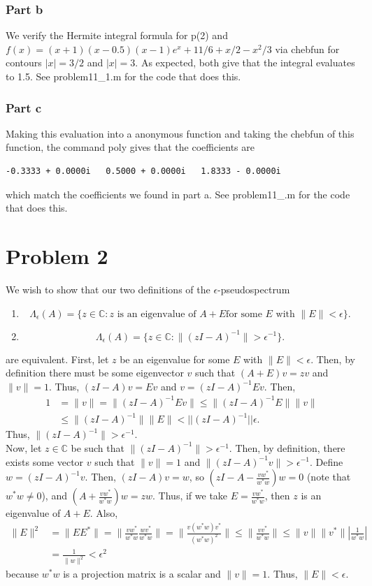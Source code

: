 \documentclass{article}
\begin{document}
\subsubsection{Part b}
We verify the Hermite integral formula for p(2) and $f(x)=(x+1)(x-0.5)(x-1)e^x+ 11/6+x/2-x^2/3$ via chebfun for contours $|x|=3/2$ and $|x|=3$. As expected, both give that the integral evaluates to 1.5. See problem11\_1.m for the code that does this.

\subsubsection{Part c}
Making this evaluation into a anonymous function and taking the chebfun of this function, the command poly gives that the coefficients are 
\begin{verbatim}
-0.3333 + 0.0000i   0.5000 + 0.0000i   1.8333 - 0.0000i
\end{verbatim}
which match the coefficients we found in part a. See problem11\_.m for the code that does this. 

\section{Problem 2} 
We wish to show that our two definitions of the $\epsilon$-pseudospectrum
\begin{enumerate}
\item 
\[
\Lambda_{\epsilon} (A) = \{ z \in \mathbb{C} : z \mbox{ is an eigenvalue of $A+E$
for some $E$ with $\| E \| < \epsilon$} \} .
\]
\item
\[
\Lambda_{\epsilon} (A) = \{ z \in \mathbb{C} : \| (zI - A )^{-1} \| > \epsilon^{-1} \} .
\]
\end{enumerate}
are equivalent. First, let $z$ be an eigenvalue for some $E$ with $\| E \| < \epsilon$. Then, by definition there must be some eigenvector $v$ such that $(A+E)v=zv$ and $\|v\|=1$. Thus, $(zI-A)v=Ev$ and $v=(zI-A)^{-1}Ev$. Then,
\begin{align*}
1&=\|v\|=\|(zI-A)^{-1}Ev\|\leq\|(zI-A)^{-1}E\|\|v\|\\&\leq\|(zI-A)^{-1}\|\|E\|<||(zI-A)^{-1}||\epsilon.
\end{align*}
Thus, $\|(zI - A )^{-1} \| > \epsilon^{-1}$. \\
Now, let $z\in\mathbb{C}$ be such that $\|(zI - A )^{-1} \| > \epsilon^{-1}$. Then, by definition, there exists some vector $v$ such that $\|v\|=1$ and $\|(zI - A )^{-1} v\| > \epsilon^{-1}$. Define $w=(zI - A )^{-1} v$. Then, $(zI - A )v=w$, so $(zI - A -\frac{vw^*}{w^*w})w=0$ (note that $w^*w\neq0$), and $(A +\frac{vw^*}{w^*w})w=zw$. Thus, if we take $E=\frac{vw^*}{w^*w}$, then $z$ is an eigenvalue of $A+E$. Also,
\begin{align*}
\|E\|^2&=\|EE^*\|=\|\frac{vw^*}{w^*w}\frac{wv^*}{w^*w}\|=\|\frac{v(w^*w)v^*}{(w^*w)^2}\|\leq\|\frac{vv^*}{w^*w}\|\leq\|v\|\|v^*\|\left|\frac{1}{w^*w}\right|\\&=
\frac{1}{\|w\|^2}<\epsilon^2
\end{align*}
because $w^*w$ is a projection matrix is a scalar and $\|v\|=1$. Thus, $\|E\|<\epsilon$.
\end{document}
